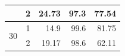 \documentclass[conference]{IEEEtran}
\begin{document}
\begin{table}[]
\begin{tabular}{|c|c|r|r|r|}
                                                                                           & 2                                                                                 & 24.73                                    & 97.3                                              & 77.54                                                                                              \\ \hline
\multirow{2}{*}{30}                                                                        & 1                                                                               & 14.9                                     & 99.6                                              & 81.75                                                                                              \\ \cline{2-5} 
                                                                                           & 2                                                                                 & 19.17                                    & 98.6                                              & 62.11                                                                                              \\ \hline
\end{tabular}
\end{table}
\end{document}
